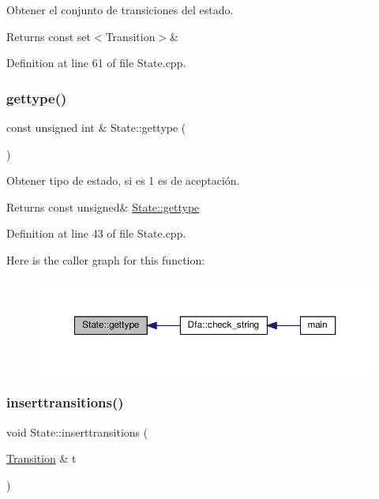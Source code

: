 Obtener el conjunto de transiciones del estado. 

\begin{DoxyReturn}{Returns}
const set$<$\+Transition$>$\& 
\end{DoxyReturn}


Definition at line 61 of file State.\+cpp.

\mbox{\label{class_state_ad701488d3ba934847dcea6222d65719e}} 
\subsubsection{\texorpdfstring{gettype()}{gettype()}}
{\footnotesize\ttfamily const unsigned int \& State\+::gettype (\begin{DoxyParamCaption}{ }\end{DoxyParamCaption})}



Obtener tipo de estado, si es 1 es de aceptación. 

\begin{DoxyReturn}{Returns}
const unsigned\& \hyperlink{class_state_ad701488d3ba934847dcea6222d65719e}{State\+::gettype} 
\end{DoxyReturn}


Definition at line 43 of file State.\+cpp.

Here is the caller graph for this function\+:
\nopagebreak
\begin{figure}[H]
\begin{center}
\leavevmode
\includegraphics[width=350pt]{class_state_ad701488d3ba934847dcea6222d65719e_icgraph}
\end{center}
\end{figure}
\mbox{\label{class_state_af93c774d8cbb27b81f2c86a0036f32d2}} 
\subsubsection{\texorpdfstring{inserttransitions()}{inserttransitions()}}
{\footnotesize\ttfamily void State\+::inserttransitions (\begin{DoxyParamCaption}\item[{\hyperlink{class_transition}{Transition} \&}]{t }\end{DoxyParamCaption})}




